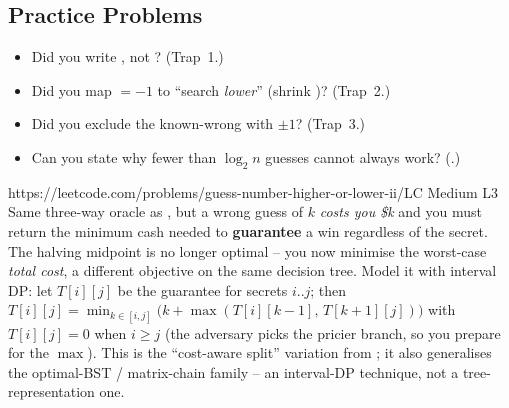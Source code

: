 \subsection{Practice Problems}

\begin{stuckbox}
\begin{itemize}[nosep, leftmargin=1.4em]
  \item Did you write , not ? (Trap~1.)
  \item Did you map $=-1$ to ``search \emph{lower}'' (shrink )? (Trap~2.)
  \item Did you exclude the known-wrong  with $\pm1$? (Trap~3.)
  \item Can you state why fewer than $\log_2 n$ guesses cannot always work? (.)
\end{itemize}
\end{stuckbox}

\begin{practiceset}
    {https://leetcode.com/problems/guess-number-higher-or-lower-ii/}{LC Medium L3}
    {Same three-way oracle as , but a wrong guess of $k$ \emph{costs you \$k} and
    you must return the minimum cash needed to \textbf{guarantee} a win regardless of the secret. The
    halving midpoint is no longer optimal -- you now minimise the worst-case \emph{total cost}, a
    different objective on the same decision tree. Model it with interval DP: let $T[i][j]$ be the
    guarantee for secrets $i..j$; then $T[i][j]=\min_{k\in[i,j]}\big(k+\max(T[i][k-1],\,T[k+1][j])\big)$
    with $T[i][j]=0$ when $i\ge j$ (the adversary picks the pricier branch, so you prepare for the
    $\max$). This is the ``cost-aware split'' variation from ; it also generalises
    the optimal-BST / matrix-chain family -- an interval-DP technique, not a tree-representation one.}
\end{practiceset}


